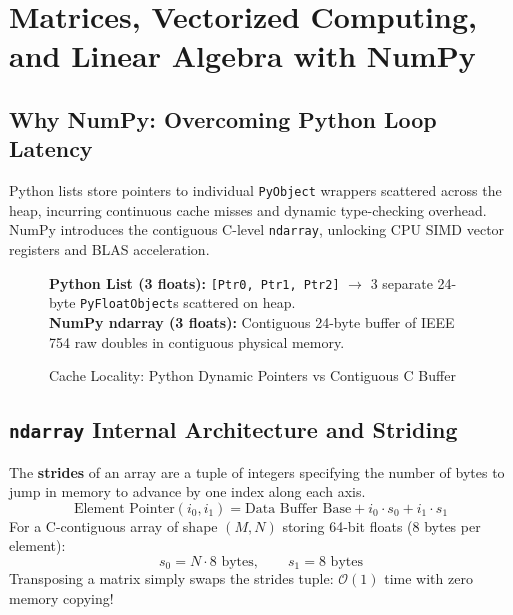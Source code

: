 \chapter{Matrices, Vectorized Computing, and Linear Algebra with NumPy}
\label{chap:matrices-numpy}

\section{Why NumPy: Overcoming Python Loop Latency}
Python lists store pointers to individual \texttt{PyObject} wrappers scattered across the heap, incurring continuous cache misses and dynamic type-checking overhead. NumPy introduces the contiguous C-level \texttt{ndarray}, unlocking CPU SIMD vector registers and BLAS acceleration.

\begin{figure}[htbp]
\centering
\begin{tcolorbox}[colback=boxgraybg,colframe=boxnavyborder,title={Memory Comparison: List of Floats vs NumPy ndarray}]
\small
\textbf{Python List (3 floats):} \texttt{[Ptr0, Ptr1, Ptr2]} $\longrightarrow$ 3 separate 24-byte \texttt{PyFloatObject}s scattered on heap.\\
\textbf{NumPy ndarray (3 floats):} Contiguous 24-byte buffer of IEEE 754 raw doubles in contiguous physical memory.
\end{tcolorbox}
\caption{Cache Locality: Python Dynamic Pointers vs Contiguous C Buffer}
\end{figure}

\section{\texttt{ndarray} Internal Architecture and Striding}
\begin{definition}
The \textbf{strides} of an array are a tuple of integers specifying the number of bytes to jump in memory to advance by one index along each axis.
\begin{equation}
\text{Element Pointer}(i_0, i_1) = \text{Data Buffer Base} + i_0 \cdot s_0 + i_1 \cdot s_1
\end{equation}
For a C-contiguous array of shape $(M, N)$ storing 64-bit floats ($8$ bytes per element):
\begin{equation}
s_0 = N \cdot 8 \text{ bytes}, \qquad s_1 = 8 \text{ bytes}
\end{equation}
Transposing a matrix simply swaps the strides tuple: $\mathcal{O}(1)$ time with zero memory copying!
\end{definition}

